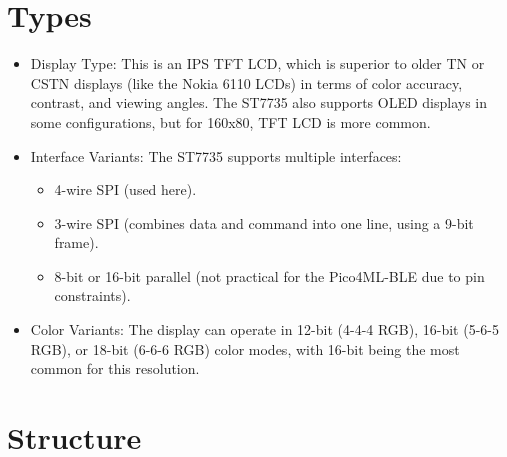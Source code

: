 \section{Types}

\begin{itemize}

	\item Display Type: This is an IPS TFT LCD, which is superior to older TN or CSTN displays (like the Nokia 6110 LCDs) in terms of color accuracy, contrast, and viewing angles. The ST7735 also supports OLED displays in some configurations, but for 160x80, TFT LCD is more common.

	\item Interface Variants: The ST7735 supports multiple interfaces:

	\begin{itemize}

		\item 4-wire SPI (used here).

		\item 3-wire SPI (combines data and command into one line, using a 9-bit frame).

		\item 8-bit or 16-bit parallel (not practical for the Pico4ML-BLE due to pin constraints).

	\end{itemize}

	\item Color Variants: The display can operate in 12-bit (4-4-4 RGB), 16-bit (5-6-5 RGB), or 18-bit (6-6-6 RGB) color modes, with 16-bit being the most common for this resolution.

\end{itemize}



\section{Structure}

